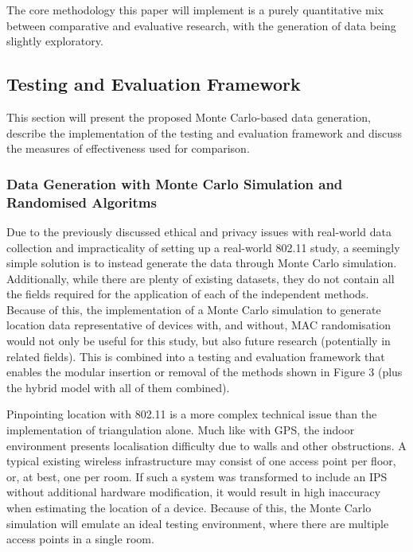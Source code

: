 
The core methodology this paper will implement is a purely quantitative mix between comparative and evaluative research, with the generation of data being slightly exploratory.

\subsection{Testing and Evaluation Framework}\label{sec:testing-framework}

This section will present the proposed Monte Carlo-based data generation, describe the implementation of the testing and evaluation framework and discuss the measures of effectiveness used for comparison.

\subsubsection{Data Generation with Monte Carlo Simulation and Randomised Algoritms}

Due to the previously discussed ethical and privacy issues with real-world data collection and impracticality of setting up a real-world 802.11 study, a seemingly simple solution is to instead generate the data through Monte Carlo simulation.
Additionally, while there are plenty of existing datasets, they do not contain all the fields required for the application of each of the independent methods.
Because of this, the implementation of a Monte Carlo simulation to generate location data representative of devices with, and without, MAC randomisation would not only be useful for this study, but also future research (potentially in related fields).
This is combined into a testing and evaluation framework that enables the modular insertion or removal of the methods shown in Figure 3 (plus the hybrid model with all of them combined).

Pinpointing location with 802.11 is a more complex technical issue than the implementation of triangulation alone.
Much like with GPS, the indoor environment presents localisation difficulty due to walls and other obstructions.
A typical existing wireless infrastructure may consist of one access point per floor, or, at best, one per room.
If such a system was transformed to include an IPS without additional hardware modification, it would result in high inaccuracy when estimating the location of a device.
Because of this, the Monte Carlo simulation will emulate an ideal testing environment, where there are multiple access points in a single room.

